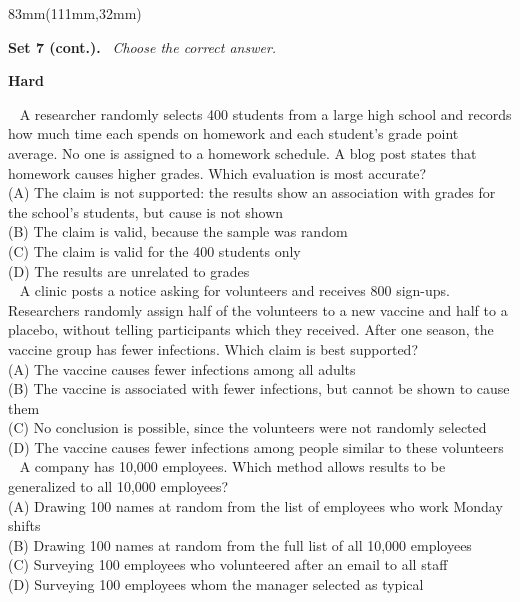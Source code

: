 \documentclass[a4paper]{article}
\newcommand{\RCOL}{111mm}
\newcommand{\COLW}{83mm}
\newcommand{\setkicker}[2]{%
{\sffamily\bfseries\fontsize{12}{14}\selectfont #1.}\ {\itshape\fontsize{11}{14}\selectfont\color{black!75} #2}\par\vspace{2mm}%
}
\newcommand{\pnum}[1]{\fcolorbox{ink}{white}{\sffamily\bfseries\fontsize{8}{8}\selectfont #1}~}
\newcommand{\satqw}[6]{%
\noindent\pnum{#1} #2\\[2mm]
\hspace*{7mm}(A) #3\\[1.6mm]
\hspace*{7mm}(B) #4\\[1.6mm]
\hspace*{7mm}(C) #5\\[1.6mm]
\hspace*{7mm}(D) #6\\[7mm]%
}
\begin{document}
\begin{textblock*}{\COLW}(\RCOL,32mm)
{\fontsize{10.3}{13}\selectfont
\setkicker{Set 7 (cont.)}{Choose the correct answer.}
{\sffamily\bfseries\color{accent}\fontsize{10.5}{12}\selectfont Hard}\par\vspace{1.5mm}
\satqw{7}{A researcher randomly selects 400 students from a large high school and records how much time each spends on homework and each student's grade point average. No one is assigned to a homework schedule. A blog post states that homework causes higher grades. Which evaluation is most accurate?}{The claim is not supported: the results show an association with grades for the school's students, but cause is not shown}{The claim is valid, because the sample was random}{The claim is valid for the 400 students only}{The results are unrelated to grades}
\satqw{8}{A clinic posts a notice asking for volunteers and receives 800 sign-ups. Researchers randomly assign half of the volunteers to a new vaccine and half to a placebo, without telling participants which they received. After one season, the vaccine group has fewer infections. Which claim is best supported?}{The vaccine causes fewer infections among all adults}{The vaccine is associated with fewer infections, but cannot be shown to cause them}{No conclusion is possible, since the volunteers were not randomly selected}{The vaccine causes fewer infections among people similar to these volunteers}
\satqw{9}{A company has 10,000 employees. Which method allows results to be generalized to all 10,000 employees?}{Drawing 100 names at random from the list of employees who work Monday shifts}{Drawing 100 names at random from the full list of all 10,000 employees}{Surveying 100 employees who volunteered after an email to all staff}{Surveying 100 employees whom the manager selected as typical}
}
\end{textblock*}
\clearpage
\end{document}
